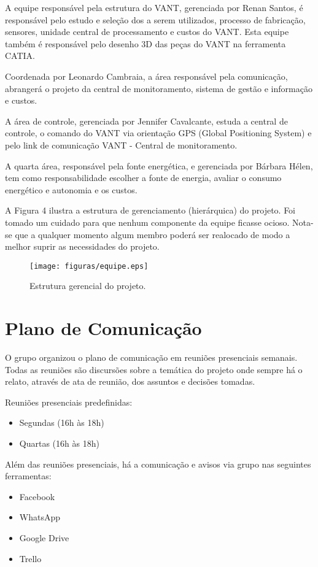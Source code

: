 A equipe responsável pela estrutura do VANT, gerenciada por Renan Santos, é responsável pelo estudo e seleção dos a serem utilizados, processo de fabricação, sensores, unidade central de processamento e custos do VANT. Esta equipe também é responsável pelo desenho 3D das peças do VANT na ferramenta CATIA.  
	
Coordenada por Leonardo Cambraia, a área responsável pela comunicação, abrangerá o projeto da central de monitoramento, sistema de gestão e informação e custos.
	
A área de controle, gerenciada por Jennifer Cavalcante, estuda a central de controle, o comando do VANT via orientação GPS (Global Positioning System) e pelo link de comunicação VANT - Central de monitoramento.
	
A quarta área, responsável pela fonte energética, e gerenciada por Bárbara Hélen, tem como responsabilidade escolher a fonte de energia, avaliar o consumo energético e autonomia e os custos.
	
A Figura 4 ilustra a estrutura de gerenciamento (hierárquica) do projeto. Foi tomado um cuidado para que nenhum componente da equipe ficasse ocioso. Nota-se que a qualquer momento algum membro poderá ser realocado de modo a melhor suprir as necessidades do projeto.

\begin{figure}[H]
	\centering
		\texttt{[image: figuras/equipe.eps]}
	\caption{Estrutura gerencial do projeto.}
\end{figure}

\section{Plano de Comunicação}
O grupo organizou o plano de comunicação em reuniões presenciais semanais. Todas as reuniões são discursões sobre a temática do projeto onde sempre há o relato, através de ata de reunião, dos assuntos e decisões tomadas. 

Reuniões presenciais predefinidas:
\begin{itemize}
	\item Segundas (16h às 18h)
	\item Quartas (16h às 18h)
\end{itemize}

Além das reuniões presenciais, há a comunicação e avisos via grupo nas seguintes ferramentas:
\begin{itemize}
	\item Facebook
	\item WhatsApp
	\item Google Drive
	\item Trello
\end{itemize}

